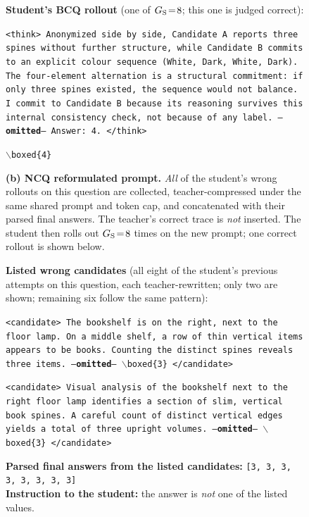 \documentclass{llmxive}
\begin{document}
\begin{figure}[!p]
\begin{prompttemplatefig}
\textbf{Student's BCQ rollout} (one of $G_{\rm S}\!=\!8$; this one is judged correct):

\smallskip
\texttt{<think> Anonymized side by side, Candidate~A reports three spines without further structure, while Candidate~B commits to an explicit colour sequence (White, Dark, White, Dark). The four-element alternation is a structural commitment: if only three spines existed, the sequence would not balance. I commit to Candidate~B because its reasoning survives this internal consistency check, not because of any label. ---\textbf{omitted}--- Answer: 4. </think>}

\smallskip
\texttt{$\backslash$boxed\{4\}} \quad \checkmark
\end{prompttemplatefig}

\vspace{1pt}\noindent\textbf{(b) NCQ reformulated prompt.} \emph{All} of the student's wrong rollouts on this question are collected, teacher-compressed under the same shared prompt and token cap, and concatenated with their parsed final answers. The teacher's correct trace is \emph{not} inserted. The student then rolls out $G_{\rm S}\!=\!8$ times on the new prompt; one correct rollout is shown below.

\begin{negcandidatebox}
\textbf{Listed wrong candidates} (all eight of the student's previous attempts on this question, each teacher-rewritten; only two are shown; remaining six follow the same pattern):

\smallskip
\texttt{<candidate> The bookshelf is on the right, next to the floor lamp. On a middle shelf, a row of thin vertical items appears to be books. Counting the distinct spines reveals three items. ---\textbf{omitted}--- $\backslash$boxed\{3\} </candidate>}

\smallskip
\texttt{<candidate> Visual analysis of the bookshelf next to the right floor lamp identifies a section of slim, vertical book spines. A careful count of distinct vertical edges yields a total of three upright volumes. ---\textbf{omitted}--- $\backslash$boxed\{3\} </candidate>}

\smallskip
\textbf{Parsed final answers from the listed candidates:} \texttt{[3, 3, 3, 3, 3, 3, 3, 3]} \\
\textbf{Instruction to the student:} the answer is \emph{not} one of the listed values.
\end{negcandidatebox}


\end{figure}
\end{document}
